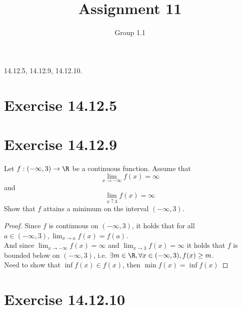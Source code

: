 \documentclass{assignment}
\title{Assignment 11}
\author{Group 1.1}
\begin{document}
\maketitle

14.12.5, 14.12.9, 14.12.10.

\section{Exercise 14.12.5}

\section{Exercise 14.12.9}
\begin{problem}
    Let $f: (-\infty, 3) \to \R$ be a continuous function.
    Assume that
    $$\lim_{x\to -\infty}f(x) = \infty$$
    and
    $$\lim_{x \uparrow 3}f(x) = \infty$$
    Show that $f$ attains a minimum on the interval $(-\infty, 3)$.
\end{problem}
\begin{proof}
    Since $f$ is continuous on $(-\infty,3)$, it holds that for all $a \in (-\infty,3), \lim_{x\to a}f(x) = f(a)$.\\
    And since $\lim_{x\to-\infty}f(x)=\infty$ and $\lim_{x \to 3}f(x) = \infty$ it holds that $f$ is bounded below on $(-\infty,3)$, i.e. $\exists m \in \R, \forall x \in (-\infty,3), f(x) \geq m$.\\
    Need to show that $\inf f(x) \in f(x)$, then $\min f(x) = \inf f(x)$
\end{proof}

\section{Exercise 14.12.10}
\end{document}
